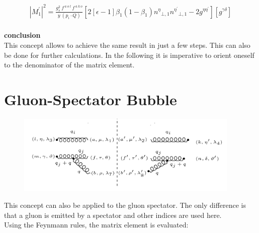 \begin{equation}
\begin{split}
{|{M}^{\prime}_1|}^2 =\frac{g_s^2 \:f^{\:a\:o\:l}\: f^{\:a\:k\:o}}{y\:(p_i\cdot Q)}[2[\epsilon-1]{\beta_1}(1-\beta_1){n^{{\eta}}}_{\bot,1}{n^{{\eta}^{\prime}}}_{\bot,1}-2g^{{\eta}{{\eta}^{\prime}}}][g^{{\gamma}{{\delta}}}]
\end{split}
\end{equation}
\\

\textbf{conclusion}
\\
This concept allows to achieve the same result in just a few steps. This can also be done for further calculations.  
In the following it is imperative to orient oneself to the denominator of the matrix element.
\pagebreak
\section{Gluon-Spectator Bubble}
\begin{figure}[ht!]
\centering
\includegraphics[width=0.95\textwidth]{images/GG/M2Squer}
\end{figure}

This concept can also be applied to the gluon spectator. The only difference is that a gluon is emitted by a spectator and other indices are used here.\\
Using the Feynmann rules, the matrix element is evaluated:

